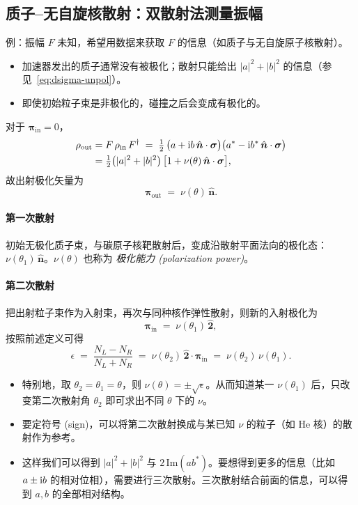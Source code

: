 \subsection{质子–无自旋核散射：双散射法测量振幅}
\label{subsec:double-scattering}

例：振幅 $F$ 未知，希望用数据来获取 $F$ 的信息（如质子与无自旋原子核散射）。
\begin{itemize}
  \item 加速器发出的质子通常没有被极化；散射只能给出 $|a|^2 + |b|^2$ 的信息（参见~\eqref{eq:dsigma-unpol}）。
  \item 即使初始粒子束是非极化的，碰撞之后会变成有极化的。
\end{itemize}
对于 $\bm{\pi}_{\text{in}}=0$，
\begin{align}
  \rho_{\text{out}} &= F\,\rho_{\text{in}}\,F^\dagger
  \;=\; \tfrac{1}{2}\,\big(a + \mathrm{i} b\,\hat{\bm n}\cdot\bm{\sigma}\big)\big(a^* - \mathrm{i} b^*\,\hat{\bm n}\cdot\bm{\sigma}\big) \notag\\
  &= \tfrac{1}{2}\big(|a|^2 + |b|^2\big)\,\big[1 + \nu(\theta)\,\hat{\bm n}\cdot\bm{\sigma}\big],
  \label{eq:rhoout-pi0}
\end{align}
故出射极化矢量为
\begin{equation}
  \bm{\pi}_{\text{out}} \;=\; \nu(\theta)\,\hat{\bm n}.
  \label{eq:piout-pi0}
\end{equation}

\paragraph{第一次散射} 初始无极化质子束，与碳原子核靶散射后，变成沿散射平面法向的极化态：$\nu(\theta_1)\,\hat{\bm n}$。$\nu(\theta)$ 也称为 \emph{极化能力 (polarization power)}。

\paragraph{第二次散射} 把出射粒子束作为入射束，再次与同种核作弹性散射，则新的入射极化为
\[
  \bm{\pi}_{\text{in}} \;=\; \nu(\theta_1)\,\hat{\bm 2},
\]
按照前述定义可得
\begin{equation}
  \epsilon \;=\; \frac{N_L - N_R}{N_L + N_R} \;=\; \nu(\theta_2)\,\hat{\bm 2}\cdot\bm{\pi}_{\text{in}} \;=\; \nu(\theta_2)\,\nu(\theta_1).
  \label{eq:double-asym}
\end{equation}

\begin{itemize}
  \item 特别地，取 $\theta_2=\theta_1=\theta$，则 $\nu(\theta)=\pm\sqrt{\epsilon}$。从而知道某一 $\nu(\theta_1)$ 后，只改变第二次散射角 $\theta_2$ 即可求出不同 $\theta$ 下的 $\nu$。
  \item 要定符号 (sign)，可以将第二次散射换成与某已知 $\nu$ 的粒子（如 $\mathrm{He}$ 核）的散射作为参考。
  \item 这样我们可以得到 $|a|^2 + |b|^2$ 与 $2\,\mathrm{Im}(ab^*)$。要想得到更多的信息（比如 $a\pm \mathrm{i} b$ 的相对位相），需要进行三次散射。三次散射结合前面的信息，可以得到 $a,b$ 的全部相对结构。
\end{itemize}


